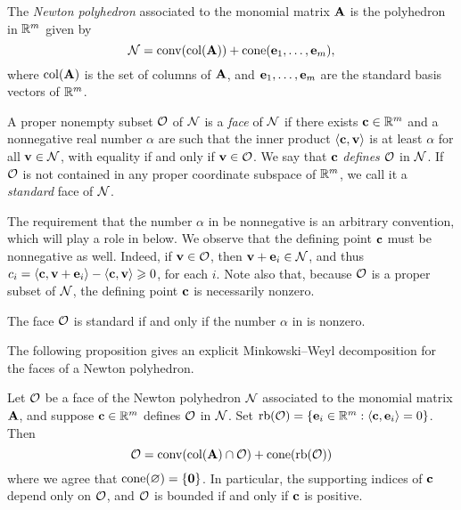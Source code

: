 \documentclass{amsart}
\begin{document}
\begin{definition}
The \emph{Newton polyhedron} associated to the monomial matrix $\mathbf{A}$ is the polyhedron in $\mathbb{R}^m$ given by
\[ \mathcal{N} = \operatorname{conv}( \operatorname{col}(\mathbf{A}) ) + \operatorname{cone}( \mathbf{e}_1, \ldots, \mathbf{e}_m), \]
where $\operatorname{col}(\mathbf{A})$ is the set of columns of $\mathbf{A}$, and $\mathbf{e}_1, \ldots, \mathbf{e}_m$ are the standard basis vectors of $\mathbb{R}^m$.
\end{definition}

\begin{definition}[Face]
   \label{defn: face}
   A proper nonempty subset $\mathcal{O}$ of $\mathcal{N}$ is a \emph{face} of $\mathcal{N}$ if there exists $\mathbf{c} \in \mathbb{R}^m$ and a nonnegative real number $\alpha$ are such that the inner product $\langle \mathbf{c}, \mathbf{v} \rangle$ is at least $\alpha$ for all $\mathbf{v} \in \mathcal{N}$, with equality if and only if $\mathbf{v} \in \mathcal{O}$.
   We say that $\mathbf{c}$ \emph{defines} $\mathcal{O}$ in $\mathcal{N}$.
   If $\mathcal{O}$ is not contained in any proper coordinate subspace of $\mathbb{R}^m$, we call it a \emph{standard} face of $\mathcal{N}$.
\end{definition}

\begin{remark}
   \label{rmk: nonnegativity of defining point}
   The requirement that the number $\alpha$ in  be nonnegative is an arbitrary convention, which will play a role in  below.
   We observe that the defining point $\mathbf{c}$ must be nonnegative as well.
   Indeed, if $\mathbf{v} \in \mathcal{O}$, then $\mathbf{v} + \mathbf{e}_i \in \mathcal{N}$, and thus $c_i = \langle \mathbf{c}, \mathbf{v} + \mathbf{e}_i \rangle - \langle \mathbf{c}, \mathbf{v} \rangle \geqslant 0$, for each $i$.
   Note also that, because $\mathcal{O}$ is a proper subset of $\mathcal{N}$, the defining point $\mathbf{c}$ is necessarily nonzero.
\end{remark}

\begin{remark}
   \label{rmk: standard faces}
   The face $\mathcal{O}$ is standard if and only if the number $\alpha$ in  is nonzero.
\end{remark}

The following proposition gives an explicit Minkowski--Weyl decomposition for the faces of a Newton polyhedron.

\begin{proposition}
   \label{prop: MW for faces}
   Let $\mathcal{O}$ be a face of the Newton polyhedron $\mathcal{N}$ associated to the monomial matrix $\mathbf{A}$, and suppose $\mathbf{c} \in \mathbb{R}^m$ defines $\mathcal{O}$ in $\mathcal{N}$.
   Set $\operatorname{rb}(\mathcal{O}) =  \{ \mathbf{e}_i \in \mathbb{R}^m : \langle \mathbf{c}, \mathbf{e}_i \rangle = 0\}$.
   Then
   \[\mathcal{O} =  \operatorname{conv}( \operatorname{col}(\mathbf{A}) \cap \mathcal{O} ) + \operatorname{cone}(\operatorname{rb}(\mathcal{O}))\]
   where we agree that $\operatorname{cone}(\varnothing) = \{\mathbf{0}\}$.
   In particular, the supporting indices of $\mathbf{c}$ depend only on $\mathcal{O}$, and $\mathcal{O}$ is bounded if and only if $\mathbf{c}$ is positive.
\end{proposition}
\end{document}
